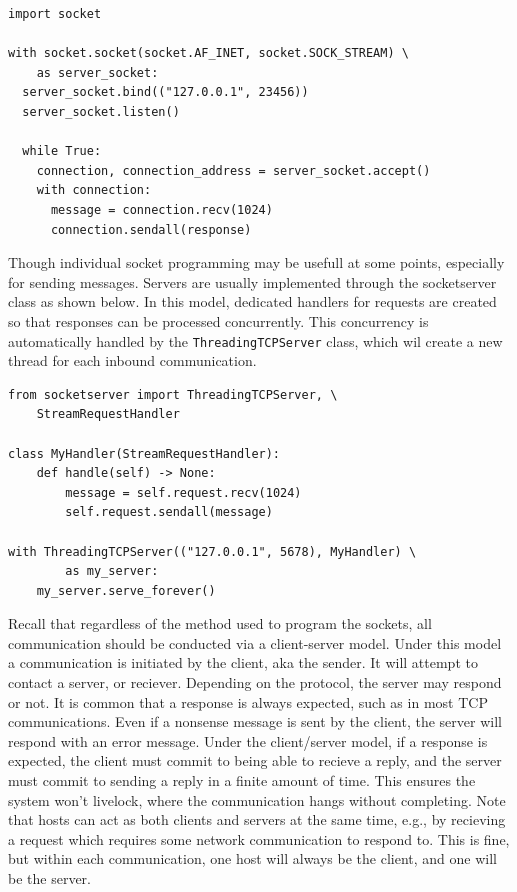 \begin{lstlisting}
import socket

with socket.socket(socket.AF_INET, socket.SOCK_STREAM) \
    as server_socket:
  server_socket.bind(("127.0.0.1", 23456))
  server_socket.listen()

  while True:
    connection, connection_address = server_socket.accept()
    with connection:
      message = connection.recv(1024)
      connection.sendall(response)
\end{lstlisting}

Though individual socket programming may be usefull at some points, especially for sending messages. Servers are usually implemented through the socketserver class as shown below. In this model, dedicated handlers for requests are created so that responses can be processed concurrently. This concurrency is automatically handled by the \texttt{ThreadingTCPServer} class, which wil create a new thread for each inbound communication.

\begin{lstlisting}
from socketserver import ThreadingTCPServer, \
	StreamRequestHandler

class MyHandler(StreamRequestHandler):
	def handle(self) -> None:
		message = self.request.recv(1024)
		self.request.sendall(message)

with ThreadingTCPServer(("127.0.0.1", 5678), MyHandler) \
		as my_server:
	my_server.serve_forever()
\end{lstlisting}

Recall that regardless of the method used to program the sockets, all communication should be conducted via a client-server model. Under this model a communication is initiated by the client, aka the sender. It will attempt to contact a server, or reciever. Depending on the protocol, the server may respond or not. It is common that a response is always expected, such as in most TCP communications. Even if a nonsense message is sent by the client, the server will respond with an error message. Under the client/server model, if a response is expected, the client must commit to being able to recieve a reply, and the server must commit to sending a reply in a finite amount of time. This ensures the system won't livelock, where the communication hangs without completing. Note that hosts can act as both clients and servers at the same time, e.g., by recieving a request which requires some network communication to respond to. This is fine, but within each communication, one host will always be the client, and one will be the server.

